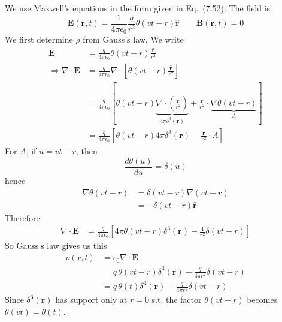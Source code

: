 \documentclass[12pt]{article}
\begin{document}
\begin{enumerate}
We use Maxwell's equations in the form given in Eq.~(7.52). The field is
$$
\mathbf E(\mathbf r,t)=\frac{1}{4\pi\epsilon_0}\frac{q}{r^2}\theta(vt-r)\hat{\mathbf r}
\qquad
\mathbf B(\mathbf r,t)=0
$$
We first determine $\rho$ from Gauss's law. We write
$$
\begin{aligned}
\mathbf E&=\frac{q}{4\pi\epsilon_0}\theta(vt-r)\frac{\hat{\mathbf r}}{r^2}\\
\Longrightarrow\nabla \cdot \mathbf E
&=
\frac{q}{4\pi\epsilon_0}
\nabla \cdot \left[\theta(vt-r)\frac{\hat{\mathbf r}}{r^2}\right] \\
&=
\frac{q}{4\pi\epsilon_0}
\left[
\theta(vt-r)\underbrace{ \nabla\cdot\left(\frac{\hat{\mathbf r}}{r^2}\right) }_{ 4\pi\delta^3(\mathbf r) }
+
\frac{\hat{\mathbf r}}{r^2}\cdot \underbrace{ \nabla\theta(vt-r) }_{ A}
\right]\\
&= \frac{q}{4\pi\epsilon_{0}}[\theta(vt -r)4\pi\delta^{3}(\mathbf{r})-\frac{\hat{\mathbf r}}{r^{2}}\cdot A]
\end{aligned}
$$
For $A$, if $u=vt-r$, then
$$
\frac{d\theta(u)}{du}=\delta(u)
$$
hence
$$
\begin{aligned}
\nabla\theta(vt-r)
&=
\delta(vt-r)\nabla(vt-r) \\
&=
-\delta(vt-r)\hat{\mathbf r}
\end{aligned}
$$
Therefore
$$
\begin{aligned}
\nabla \cdot \mathbf E
&=
\frac{q}{4\pi\epsilon_0}
\left[
4\pi\theta(vt-r)\delta^3(\mathbf r)
-
\frac{1}{r^2}\delta(vt-r)
\right]
\end{aligned}
$$
So Gauss's law gives us this
$$
\begin{aligned}
\rho(\mathbf r,t)
&=
\epsilon_0 \nabla \cdot \mathbf E \\
&=
q\,\theta(vt-r)\delta^3(\mathbf r)
-
\frac{q}{4\pi r^2}\delta(vt-r)\\
&=
q\,\theta(t)\delta^3(\mathbf r)
-
\frac{q}{4\pi r^2}\delta(vt-r)
\end{aligned}
$$
Since $\delta^3(\mathbf r)$ has support only at $r=0$ s.t. the factor $\theta(vt-r)$ becomes $\theta(vt)=\theta(t)$. \\



\end{enumerate}
\end{document}
